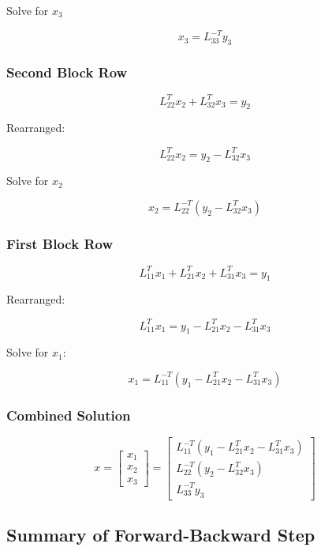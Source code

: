 \documentclass[
  letterpaper,
  DIV=11,
  numbers=noendperiod]{scrartcl}
\begin{document}
Solve for \(x_3\)

\[
x_3 = L_{33}^{-T}y_3
\]

\subsubsection{\texorpdfstring{\textbf{Second Block
Row}}{Second Block Row}}\label{second-block-row-1}

\[
L_{22}^Tx_2 + L_{32}^Tx_3 = y_2
\]

Rearranged:

\[
L_{22}^Tx_2 = y_2 - L_{32}^Tx_3
\]

Solve for \(x_2\)

\[
x_2 = L_{22}^{-T}\left(y_2 - L_{32}^Tx_3\right)
\]

\subsubsection{\texorpdfstring{\textbf{First Block
Row}}{First Block Row}}\label{first-block-row-1}

\[
L_{11}^Tx_1 + L_{21}^Tx_2 + L_{31}^Tx_3 = y_1
\]

Rearranged:

\[
L_{11}^Tx_1 = y_1 - L_{21}^Tx_2 - L_{31}^Tx_3
\]

Solve for \(x_1\):

\[
x_1 = L_{11}^{-T}\left(y_1 - L_{21}^Tx_2 - L_{31}^Tx_3\right)
\]

\subsubsection{\texorpdfstring{\textbf{Combined
Solution}}{Combined Solution}}\label{combined-solution-1}

\[
x = \begin{bmatrix}
x_1 \\
x_2 \\
x_3
\end{bmatrix} =
\begin{bmatrix}
L_{11}^{-T}\left(y_1 - L_{21}^Tx_2 - L_{31}^Tx_3\right) \\
L_{22}^{-T}\left(y_2 - L_{32}^Tx_3\right) \\
L_{33}^{-T}y_3
\end{bmatrix}
\]

\subsection{Summary of Forward-Backward
Step}\label{summary-of-forward-backward-step}
\end{document}
